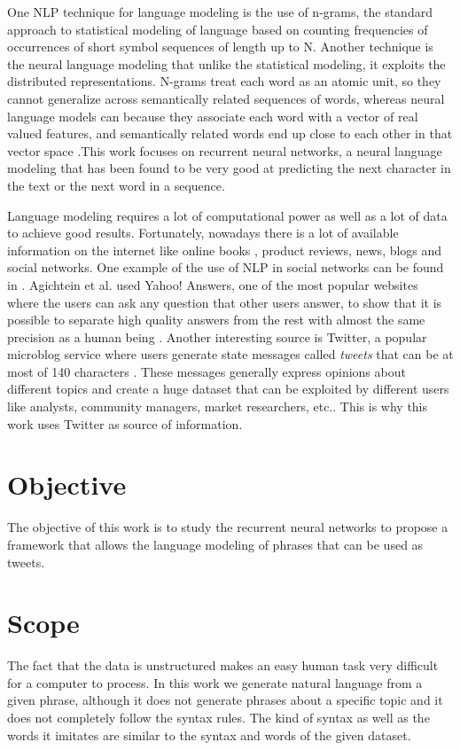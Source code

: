 One NLP technique for language modeling is the use of n-grams, the standard approach to statistical modeling of language based on counting frequencies of occurrences of short symbol sequences of length up to N. Another technique is the neural language modeling that unlike the statistical modeling, it exploits the  distributed representations. N-grams treat each word as an atomic unit, so they cannot generalize across semantically related sequences of words, whereas neural language models can because they associate each word with a vector of real valued features, and semantically related words end up close to each other in that vector space  \cite{lecun2015deep} .This work focuses on recurrent neural networks, a neural language modeling that has been found to be very good at predicting the next character in the text or the next word in a sequence.

Language modeling requires a lot of computational power as well as a lot of data to achieve good results. Fortunately, nowadays there is a lot of available information on the internet like online books , product reviews, news, blogs and social networks. One example of the use of NLP in social networks can be found in   \cite{agichtein2008finding}.  Agichtein et al. used Yahoo! Answers, one of the most popular websites where the users can ask any question that other users answer, to show that it is possible to separate high quality answers from the rest with almost the same precision as a human being .   Another interesting source is Twitter, a popular microblog service where users  generate state messages called \textit{tweets} that can be at most of 140 characters \cite{go2009twitter}. These messages generally express opinions about different topics and create a huge dataset that can be  exploited by different users like analysts, community managers, market researchers, etc.. This is why this work uses Twitter as source of information. 


\section{Objective}
The objective of this work is to study the recurrent neural networks to propose a framework that allows the language modeling  of phrases that can be used as tweets. 

\section{Scope}
The fact that the data is unstructured makes an easy human task  very difficult for a computer to process. In this work we generate natural language from a given phrase, although it does not generate phrases about a specific topic and it does not completely follow the syntax rules. The kind of syntax as well as the words it imitates are similar to the syntax and words of the given dataset. 

